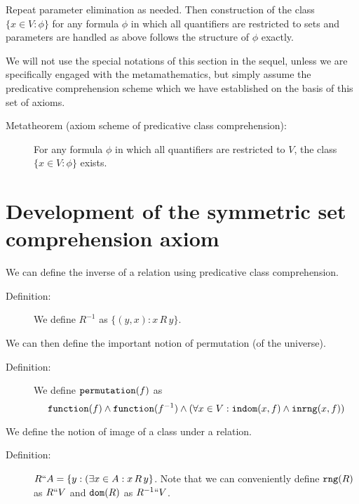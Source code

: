 \documentclass[12pt]{article}
\begin{document}
Repeat parameter elimination as needed.  Then construction of the class $\{x \in V:\phi\}$ for any formula $\phi$ in which all quantifiers are restricted to sets and parameters are handled as above follows the structure of $\phi$ exactly.

We will not use the special notations of this section in the sequel, unless we are specifically engaged with the metamathematics, but simply assume the predicative comprehension scheme which we have established on the basis of this set of axioms.
\begin{description}
\item[Metatheorem (axiom scheme of predicative class comprehension):]  For any formula $\phi$ in which all quantifiers are restricted to $V$,
the class $\{x \in V:\phi\}$ exists.
\end{description}

\section{Development of the symmetric set comprehension axiom}

We can define the inverse of a relation using predicative class comprehension.

\begin{description}

\item[Definition:]  We define $R^{-1}$ as $\{(y,x):x \, R\, y\}$.

\end{description}

We can then define the important notion of permutation (of the universe).

\begin{description}

\item[Definition:]  We define ${\tt permutation}(f)$ as $${\tt function}(f) \wedge {\tt function}(f^{-1}) \wedge (\forall x \in V:{\tt indom}(x,f) \wedge {\tt inrng}(x,f))$$

\end{description}

We define the notion of image of a class under a relation.

\begin{description}

\item[Definition:]  $R``A = \{y:(\exists x \in A:x \, R\, y\}$.    Note that we can conveniently define ${\tt rng}(R)$ as $R``V$
and ${\tt dom}(R)$ as $R^{-1}``V$.

\end{description}
\end{document}

